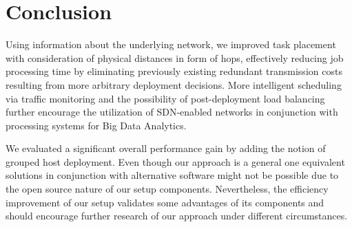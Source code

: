 \section{Conclusion}
Using information about the underlying network, we improved task placement with consideration of
physical distances in form of hops, effectively reducing job processing time by eliminating
previously existing redundant transmission costs resulting from more arbitrary deployment decisions.
More intelligent scheduling via traffic monitoring and the possibility of post-deployment load
balancing further encourage the utilization of SDN-enabled networks in conjunction with processing
systems for Big Data Analytics.

We evaluated a significant overall performance gain by adding the notion of grouped host deployment.
Even though our approach is a general one equivalent solutions in conjunction with alternative
software might not be possible due to the open source nature of our setup components. Nevertheless,
the efficiency improvement of our setup validates some advantages of its components and should
encourage further research of our approach under different circumstances.
